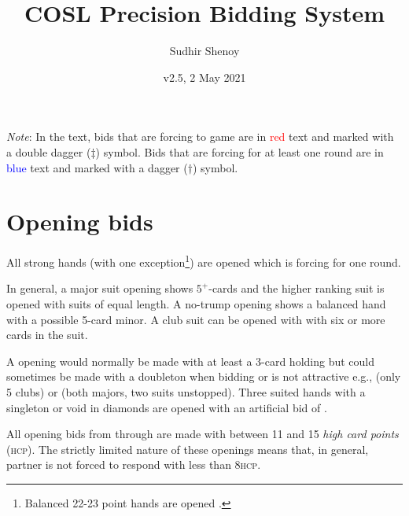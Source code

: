 \documentclass[a4paper,article,oneside]{memoir}
\newcommand{\gap}{\vspace{\baselineskip}}
\newcommand{\hcp}{\textsc{hcp}}
\begin{document}
\title{COSL Precision Bidding System}
\author{Sudhir Shenoy}
\date{v2.5, 2 May 2021}
\maketitle

\tableofcontents

\gap

\emph{Note}: In the text, bids that are forcing to game are in
\textcolor{red}{red} text and marked with a double dagger ($\ddagger$)
symbol. Bids that are forcing for at least one round are in
\textcolor{blue}{blue} text and marked with a dagger ($\dagger$)
symbol.

\pagebreak

\section{Opening bids}

All strong hands (with one exception\footnote{Balanced 22-23 point
  hands are opened .}) are opened  which is forcing for
one round.

In general, a major suit opening shows $5^+$-cards and the higher
ranking suit is opened with suits of equal length. A no-trump opening
shows a balanced hand with a possible 5-card minor. A club suit can be
opened with  with six or more cards in the suit.

A  opening would normally be made with at least a 3-card holding
but could sometimes be made with a doubleton when bidding  or
 is not attractive e.g.,  (only 5 clubs)
or  (both majors, two suits unstopped). Three
suited hands with a singleton or void in diamonds are opened with an
artificial bid of .

All opening bids from  through  are made with between 11
and 15 \emph{high card points} (\hcp). The strictly limited nature of
these openings means that, in general, partner is not forced to
respond with less than 8\hcp.
\end{document}
